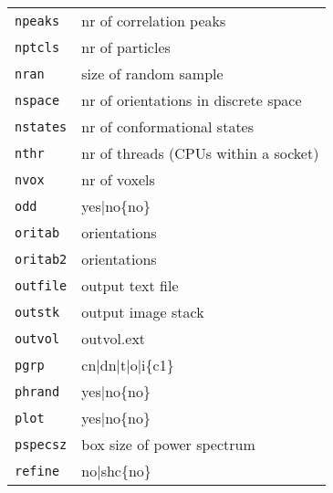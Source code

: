 \documentclass[a4paper,11pt]{article}
\begin{document}
\begin{tabular}{ll}
\texttt{npeaks}&{nr of correlation peaks}\\
\texttt{nptcls}&{nr of particles}\\
\texttt{nran}&{size of random sample}\\
\texttt{nspace}&{nr of orientations in discrete space}\\
\texttt{nstates}&{nr of conformational states}\\
\texttt{nthr}&{nr of threads (CPUs within a socket)}\\
\texttt{nvox}&{nr of voxels}\\
\texttt{odd}&{yes|no\{no\}}\\
\texttt{oritab}&{orientations}\\
\texttt{oritab2}&{orientations}\\
\texttt{outfile}&{output text file}\\
\texttt{outstk}&{output image stack}\\
\texttt{outvol}&{outvol.ext}\\
\texttt{pgrp}&{cn|dn|t|o|i\{c1\}}\\
\texttt{phrand}&{yes|no\{no\}}\\
\texttt{plot}&{yes|no\{no\}}\\
\texttt{pspecsz}&{box size of power spectrum}\\
\texttt{refine}&{no|shc\{no\}}\\
\end{tabular}
\end{document}
